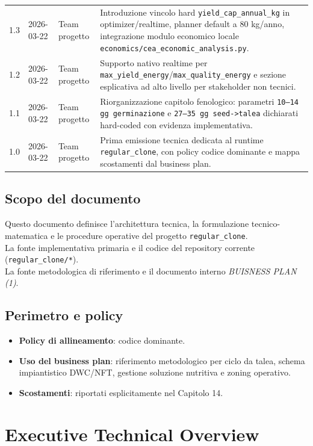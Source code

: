 ﻿\documentclass[11pt,a4paper]{report}
\begin{document}
\begin{longtable}{@{}p{2.2cm}p{2.2cm}p{3.6cm}p{6.8cm}@{}}
1.3 & 2026-03-22 & Team progetto & Introduzione vincolo hard \texttt{yield\_cap\_annual\_kg} in optimizer/realtime, planner default a 80 kg/anno, integrazione modulo economico locale \texttt{economics/cea\_economic\_analysis.py}. \\
1.2 & 2026-03-22 & Team progetto & Supporto nativo realtime per \texttt{max\_yield\_energy}/\texttt{max\_quality\_energy} e sezione esplicativa ad alto livello per stakeholder non tecnici. \\
1.1 & 2026-03-22 & Team progetto & Riorganizzazione capitolo fenologico: parametri \texttt{10--14 gg germinazione} e \texttt{27--35 gg seed->talea} dichiarati hard-coded con evidenza implementativa. \\
1.0 & 2026-03-22 & Team progetto & Prima emissione tecnica dedicata al runtime \texttt{regular\_clone}, con policy codice dominante e mappa scostamenti dal business plan. \\
\bottomrule
\end{longtable}

\section{Scopo del documento}
Questo documento definisce l'architettura tecnica, la formulazione tecnico-matematica e le procedure operative del progetto \texttt{regular\_clone}.\\
La fonte implementativa primaria e il codice del repository corrente (\texttt{regular\_clone/*}).\\
La fonte metodologica di riferimento e il documento interno \emph{BUISNESS PLAN (1)}.

\section{Perimetro e policy}
\begin{itemize}
  \item \textbf{Policy di allineamento}: codice dominante.
  \item \textbf{Uso del business plan}: riferimento metodologico per ciclo da talea, schema impiantistico DWC/NFT, gestione soluzione nutritiva e zoning operativo.
  \item \textbf{Scostamenti}: riportati esplicitamente nel Capitolo 14.
\end{itemize}

\newpage
\chapter{Executive Technical Overview}
\end{document}
